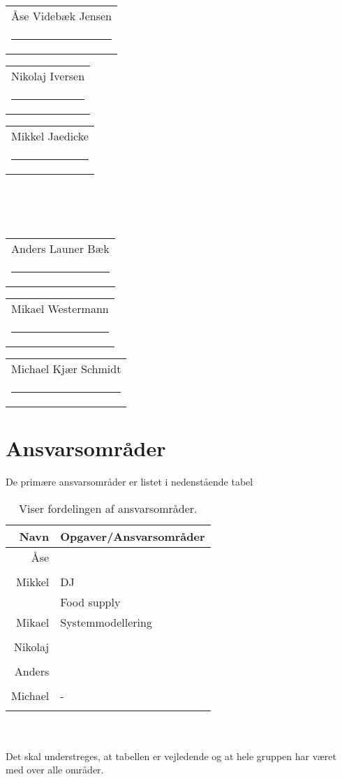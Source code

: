 



\vspace{3cm}
{
\newcommand{\namesigdate}[2][5cm]{%
  \begin{tabular}{@{}p{#1}@{}}
    #2 \\[2\normalbaselineskip] \hrule \\[0pt]
  \end{tabular}
}
\begin{changemargin}{-0cm}{-0cm}
\centering
\noindent \namesigdate[4.3cm]{Åse Videbæk Jensen} \hspace{1cm} \namesigdate[4.3cm]{Nikolaj Iversen} \hspace{1cm} \namesigdate[4.3cm]{Mikkel Jaedicke} \\~\\~\\
\centering
\noindent \namesigdate[4.3cm]{Anders Launer Bæk} \hspace{1cm}  \namesigdate[4.3cm]{Mikael Westermann} \hspace{1cm}   \namesigdate[4.3cm]{Michael Kjær Schmidt}
\end{changemargin}
}
\bigskip
\section*{Ansvarsområder}
De primære ansvarsområder er listet i nedenstående tabel
\bigskip
\begin{table}[!th]
\centering
\setlength{\extrarowheight}{5pt}
 \begin{tabular}{r|l}
Navn&Opgaver/Ansvarsområder \\[6pt] \hline
Åse&\\
&\\[6pt] \hline
Mikkel& DJ\\ 
& Food supply\\[6pt] \hline
Mikael& Systemmodellering\\
&\\[6pt] \hline
Nikolaj&\\
&\\[6pt] \hline
Anders&\\
&\\[6pt] \hline
Michael & -\\
&\\ 
\end{tabular}     
\caption*{Viser fordelingen af ansvarsområder.}            
\end{table}\\~\\ 
Det skal understreges, at tabellen er vejledende og at hele gruppen har været med over alle områder.

